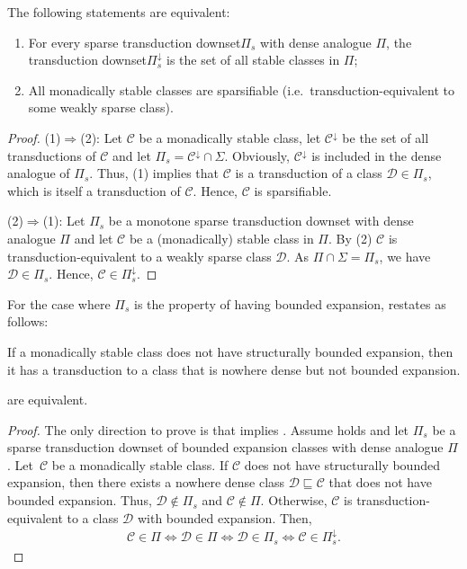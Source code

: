 \documentclass{lmcs}
\newcommand{\Cc}{\mathscr{C}}
\newcommand{\Dd}{\mathscr{D}}
\theoremstyle{definition}
\newcommand{\dset}{downset\xspace}
\begin{document}
\begin{prop}
	The following statements are equivalent:
	\begin{enumerate}
		\item 	For every sparse transduction \dset $\Pi_s$ with dense analogue $\Pi$, the  transduction \dset $\Pi_s^{\downarrow}$ is the set of all stable classes in $\Pi$;
		\item All monadically stable classes are sparsifiable (i.e.\ transduction-equivalent to some weakly sparse class).
	\end{enumerate}
\end{prop}
\begin{proof}
	(1)$\Rightarrow$(2): Let $\Cc$ be a monadically stable class, let $\Cc^{\downarrow}$ be the set of all transductions of $\Cc$ and let $\Pi_s=\Cc^{\downarrow}\cap\Sigma$. Obviously, $\Cc^{\downarrow}$ is included in the dense analogue of $\Pi_s$. Thus, (1) implies that $\Cc$ is a transduction of a class $\Dd\in\Pi_s$, which is itself a transduction of $\Cc$. Hence, $\Cc$ is sparsifiable.
	
	(2)$\Rightarrow$(1):  	Let $\Pi_s$ be a monotone sparse transduction \dset with dense analogue $\Pi$ and let $\Cc$ be a (monadically) stable class in $\Pi$.  By (2) $\Cc$ is transduction-equivalent to a weakly sparse class $\Dd$. As $\Pi\cap\Sigma=\Pi_s$, we have $\Dd\in\Pi_s$.  Hence, $\Cc\in\Pi_s^{\downarrow}$.
\end{proof}

For the case where $\Pi_s$ is the property of having bounded expansion,  restates as follows:
\begin{conj}
	\label{conj:BE}
	If a monadically stable class does not have structurally bounded expansion, then it has a transduction to a class that is nowhere dense but not bounded expansion.
\end{conj}

\begin{prop}
	 are equivalent.
\end{prop}
\begin{proof}
 The only direction to prove is that  implies . Assume  holds and let $\Pi_s$ be a sparse transduction \dset of bounded expansion classes with dense analogue $\Pi$.
 Let~$\Cc$ be a monadically stable class. If $\Cc$ does not have structurally bounded expansion, then there exists a nowhere dense class $\Dd\sqsubseteq\Cc$ that does not have bounded expansion. Thus, $\Dd\notin\Pi_s$ and $\Cc\notin\Pi$.
 Otherwise, $\Cc$ is transduction-equivalent  to a class $\Dd$ with bounded expansion. Then, 
 \begin{align*}
 \Cc\in\Pi\iff\Dd\in\Pi\iff\Dd\in\Pi_s\iff\Cc\in\Pi_s^{\downarrow}. \tag*{\qedhere}
\end{align*}
\end{proof}
\end{document}
